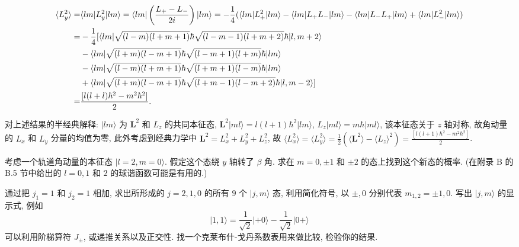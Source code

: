\documentclass{assignment}
\begin{document}
\begin{pf}
\begin{align}
        \notag\langle L_y^2\rangle=&\langle lm\rvert L_y^2\lvert lm\rangle=\langle lm\rvert\left(\frac{L_+-L_-}{2i}\right)\lvert lm\rangle=-\frac{1}{4}(\langle lm\rvert L_+^2\lvert lm\rangle-\langle lm\rvert L_+L_-\lvert lm\rangle-\langle lm\rvert L_-L_+\lvert lm\rangle+\langle lm\rvert L_-^2\lvert lm\rangle)\\
        \notag=&-\frac{1}{4}[\langle lm\rvert\sqrt{(l-m)(l+m+1)}\hbar\sqrt{(l-m-1)(l+m+2)}\hbar\lvert l,m+2\rangle\\
        \notag&-\langle lm\rvert\sqrt{(l+m)(l-m+1)}\hbar\sqrt{(l-m+1)(l+m)}\hbar\lvert lm\rangle\\
        \notag&-\langle lm\rvert\sqrt{(l-m)(l+m+1)}\hbar\sqrt{(l+m+1)(l-m)}\hbar\lvert lm\rangle\\
        \notag&+\langle lm\rvert\sqrt{(l+m)(l-m+1)}\hbar\sqrt{(l+m-1)(l-m+2)}\hbar\lvert l,m-2\rangle]\\
        =&\frac{[l(l+l)\hbar^2-m^2\hbar^2]}{2}.
    \end{align}

    对上述结果的半经典解释: $\lvert lm\rangle$ 为 $\bm{L}^2$ 和 $L_z$ 的共同本征态, $\bm{L}^2\lvert ml\rangle=l(l+1)\hbar^2\lvert lm\rangle$, $L_z\lvert ml\rangle=m\hbar\lvert ml\rangle$, 该本征态关于 $z$ 轴对称, 故角动量的 $L_x$ 和 $L_y$ 分量的均值为零, 此外考虑到经典力学中 $\bm{L}^2=L_x^2+L_y^2+L_z^2$, 故 $\langle L_x^2\rangle=\langle L_y^2\rangle=\frac{1}{2}(\langle\bm{L}^2\rangle-\langle L_z\rangle^2)=\frac{[l(l+1)\hbar^2-m^2\hbar^2]}{2}$.
\end{pf}

\begin{prob}[课本习题 3.20]
    考虑一个轨道角动量的本征态 $\lvert l=2,m=0\rangle$. 假定这个态绕 $y$ 轴转了 $\beta$ 角. 求在 $m=0,\pm 1$ 和 $\pm 2$ 的态上找到这个新态的概率. (在附录 B 的 B.5 节中给出的 $l=0,1$ 和 $2$ 的球谐函数可能是有用的.)
\end{prob}
\begin{sol}
    
\end{sol}

\begin{prob}[课本习题 3.24]
    通过把 $j_1=1$ 和 $j_2=1$ 相加, 求出所形成的 $j=2,1,0$ 的所有 $9$ 个 $\lvert j,m\rangle$ 态, 利用简化符号, 以 $\pm,0$ 分别代表 $m_{1,2}=\pm 1,0$. 写出 $\lvert j,m\rangle$ 的显示式, 例如
    \[
        \lvert 1,1\rangle=\frac{1}{\sqrt{2}}\lvert+0\rangle-\frac{1}{\sqrt{2}}\lvert 0+\rangle
    \]
    可以利用阶梯算符 $J_{\pm}$, 或递推关系以及正交性. 找一个克莱布什-戈丹系数表用来做比较, 检验你的结果.
\end{prob}
\begin{sol}
    
\end{sol}
\end{document}
